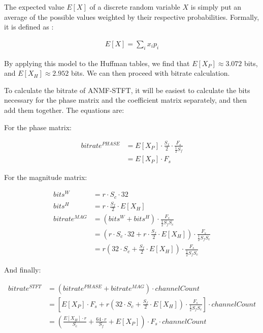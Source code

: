 The expected value $E[X]$ of a discrete random variable $X$ is simply put an average of the possible values weighted by their respective probabilities. Formally, it is defined as \cite{Ross1972IntroductionTP}:

\begin{align}
E[X] = \sum_{i}x_ip_i
\end{align}

By applying this model to the Huffman tables, we find that $E[X_P] \approx 3.072$ bits, and $E[X_H] \approx 2.952$ bits. We can then proceed with bitrate calculation.

To calculate the bitrate of ANMF-STFT, it will be easiest to calculate the bits necessary for the phase matrix and the coefficient matrix separately, and then add them together. The equations are:

For the phase matrix:

\begin{align}
bitrate^{PHASE}
&= E[X_P] \cdot \frac{S_f}{2} \cdot \frac{F_s}{\frac12 S_f} \\
&= E[X_P] \cdot F_s
\end{align}

For the magnitude matrix:

\begin{align}
bits^W &= r \cdot S_c \cdot 32 \\
bits^H &= r \cdot \frac{S_f}{2} \cdot E[X_H] \\
bitrate^{MAG} &= \left( bits^W + bits^H \right) \cdot \frac{F_s}{\frac12 S_fS_c} \\
&= \left( r \cdot S_c \cdot 32 + r \cdot \frac{S_f}{2} \cdot E[X_H] \right) \cdot \frac{F_s}{\frac12 S_fS_c} \\
&= r \left( 32 \cdot S_c + \frac{S_f}{2} \cdot E[X_H] \right) \cdot \frac{F_s}{\frac12 S_fS_c} \label{equ:anmf_stft_mag_bitrate}
\end{align}

And finally:

\begin{align}
bitrate^{STFT} &= (bitrate^{PHASE} + bitrate^{MAG}) \cdot channelCount \\
&= \left[ E[X_P] \cdot F_s + r \left( 32 \cdot S_c + \frac{S_f}{2} \cdot E[X_H] \right) \cdot \frac{F_s}{\frac12 S_fS_c} \right] \cdot channelCount \\
&= \left( \frac{E[X_H] \cdot r}{S_c} + \frac{64 \cdot r}{S_f} + E[X_P] \right) \cdot F_s \cdot channelCount \label{equ:anmf_stft_bitrate}
\end{align}

